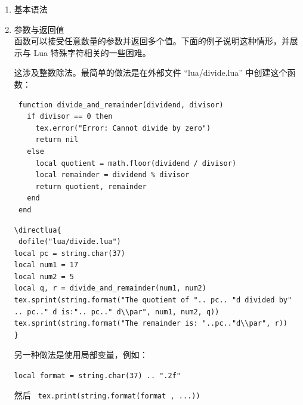  \begin{enumerate}[label=(\alph*)]
  \item 基本语法

\begin{tkzexample}[latex=.4\textwidth]
\end{tkzexample}

\item 参数与返回值\\

函数可以接受任意数量的参数并返回多个值。下面的例子说明这种情形，并展示与 Lua 特殊字符相关的一些困难。

这涉及整数除法。最简单的做法是在外部文件 “lua/divide.lua” 中创建这个函数：

\begin{mybox}
\begin{verbatim}
 function divide_and_remainder(dividend, divisor)
   if divisor == 0 then
     tex.error("Error: Cannot divide by zero")
     return nil
   else
     local quotient = math.floor(dividend / divisor)
     local remainder = dividend % divisor
     return quotient, remainder
   end
 end
\end{verbatim}
\end{mybox}

\begin{verbatim}
\directlua{
 dofile("lua/divide.lua")
local pc = string.char(37)
local num1 = 17
local num2 = 5
local q, r = divide_and_remainder(num1, num2)
tex.sprint(string.format("The quotient of ".. pc.. "d divided by"
.. pc.." d is:".. pc.." d\\par", num1, num2, q))
tex.sprint(string.format("The remainder is: "..pc.."d\\par", r))
}
\end{verbatim}


另一种做法是使用局部变量，例如：

\verb|local format = string.char(37) .. ".2f"|

然后 \verb| tex.print(string.format(format , ...))|


\end{enumerate}

